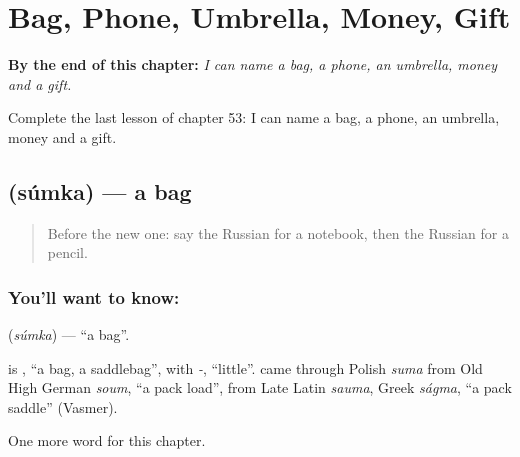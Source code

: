 
\chapter{Bag, Phone, Umbrella, Money, Gift}
\label{ch:ru-bag-phone-umbrella-money-gift}

\begin{chapteropening}
\textbf{By the end of this chapter:} \emph{I can name a bag, a phone, an umbrella, money and a gift.}

Complete the last lesson of chapter 53: I can name a bag, a phone, an umbrella, money and a gift.
\end{chapteropening}

\section[\texorpdfstring{\ru{сумка} (súmka)}{сумка (súmka)}]{ (súmka) — a bag}

\label{lesson:RU-C53-bag}



\begin{quote}
Before the new one: say the Russian for a notebook, then the Russian for a pencil.
\end{quote}

\subsection*{You'll want to know: }
\textbf{} (\emph{súmka}) — \textquotedblleft{}a bag\textquotedblright{}.

\begin{cousinweb}
\textbf{} is \emph{}, \textquotedblleft{}a bag, a saddlebag\textquotedblright{}, with \emph{-}, \textquotedblleft{}little\textquotedblright{}. \emph{} came through Polish \emph{suma} from Old High German \emph{soum}, \textquotedblleft{}a pack load\textquotedblright{}, from Late Latin \emph{sauma}, Greek \emph{ságma}, \textquotedblleft{}a pack saddle\textquotedblright{} (Vasmer).
\end{cousinweb}

\begin{grammarlens}[title={What you've built}]
One more word for this chapter.
\end{grammarlens}

